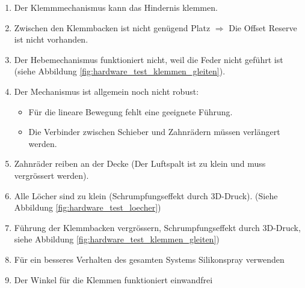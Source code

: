 \documentclass[../main.tex]{subfiles}
\begin{document}
\begin{enumerate}
    \item Der Klemmmechanismus kann das Hindernis klemmen.
    \item Zwischen den Klemmbacken ist nicht genügend Platz $\Rightarrow$ Die Offset Reserve ist nicht vorhanden.
    \item Der Hebemechanismus funktioniert nicht, weil die Feder nicht geführt ist (siehe Abbildung \ref{fig:hardware_test_klemmen_gleiten}).
    \item Der Mechanismus ist allgemein noch nicht robust:
    \begin{itemize}
        \item Für die lineare Bewegung fehlt eine geeignete Führung.
        \item Die Verbinder zwischen Schieber und Zahnrädern müssen verlängert werden.
    \end{itemize}
    \item Zahnräder reiben an der Decke (Der Luftspalt ist zu klein und muss vergrössert werden).
    \item Alle Löcher sind zu klein (Schrumpfungseffekt durch 3D-Druck). (Siehe Abbildung \ref{fig:hardware_test_loecher})
    \item Führung der Klemmbacken vergrössern, Schrumpfungseffekt durch 3D-Druck, siehe Abbildung \ref{fig:hardware_test_klemmen_gleiten})
    \item Für ein besseres Verhalten des gesamten Systems Silikonspray verwenden
    \item Der Winkel für die Klemmen funktioniert einwandfrei
\end{enumerate}
\end{document}
